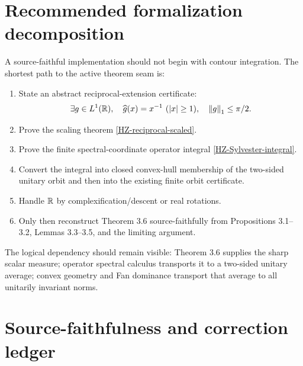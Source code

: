 \section{Recommended formalization decomposition}

A source-faithful implementation should not begin with contour integration. The shortest path to the active theorem seam is:
\begin{enumerate}
\item State an abstract reciprocal-extension certificate:
\[
  \exists g\in L^1(\mathbb{R}),\quad
  \widehat g(x)=x^{-1}\ (\left\lvert x\right\rvert\ge1),\quad
  \left\lVert g\right\rVert_1\le\pi/2.
\]
\item Prove the scaling theorem \eqref{HZ-reciprocal-scaled}.
\item Prove the finite spectral-coordinate operator integral \eqref{HZ-Sylvester-integral}.
\item Convert the integral into closed convex-hull membership of the two-sided unitary orbit and then into the existing finite orbit certificate.
\item Handle $\mathbb{R}$ by complexification/descent or real rotations.
\item Only then reconstruct Theorem 3.6 source-faithfully from Propositions 3.1--3.2, Lemmas 3.3--3.5, and the limiting argument.
\end{enumerate}

The logical dependency should remain visible: Theorem 3.6 supplies the sharp scalar measure; operator spectral calculus transports it to a two-sided unitary average; convex geometry and Fan dominance transport that average to all unitarily invariant norms.

\section{Source-faithfulness and correction ledger}

